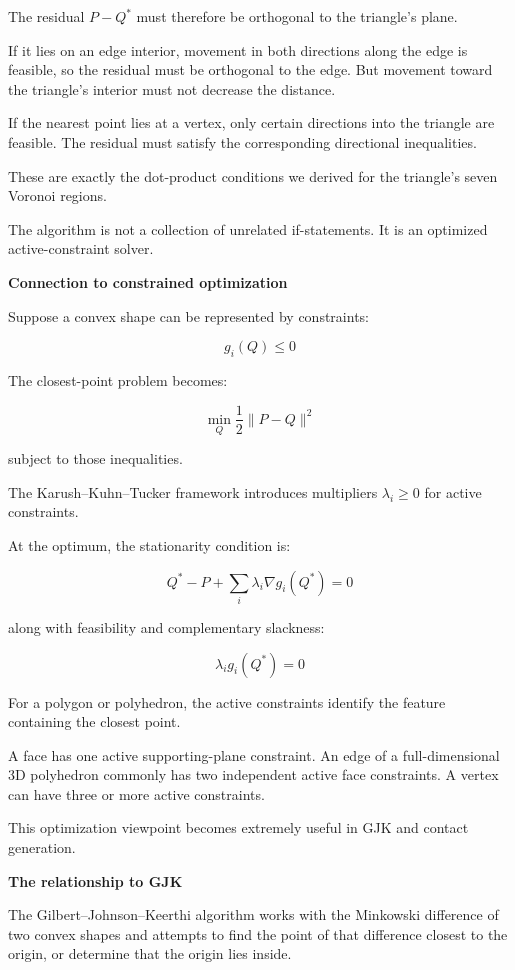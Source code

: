 The residual \(P-Q^*\) must therefore be orthogonal to the triangle's plane.

If it lies on an edge interior, movement in both directions along the edge is feasible, so the residual must be orthogonal to the edge. But movement toward the triangle's interior must not decrease the distance.

If the nearest point lies at a vertex, only certain directions into the triangle are feasible. The residual must satisfy the corresponding directional inequalities.

These are exactly the dot-product conditions we derived for the triangle's seven Voronoi regions.

The algorithm is not a collection of unrelated if-statements. It is an optimized active-constraint solver.

\textbf{Connection to constrained optimization}

Suppose a convex shape can be represented by constraints:

\[
g_i(Q)\le0
\]

The closest-point problem becomes:

\[
\min_Q \frac12\|P-Q\|^2
\]

subject to those inequalities.

The Karush--Kuhn--Tucker framework introduces multipliers \(\lambda_i\ge0\) for active constraints.

At the optimum, the stationarity condition is:

\[
Q^*-P+\sum_i\lambda_i\nabla g_i(Q^*)=0
\]

along with feasibility and complementary slackness:

\[
\lambda_i g_i(Q^*)=0
\]

For a polygon or polyhedron, the active constraints identify the feature containing the closest point.

A face has one active supporting-plane constraint. An edge of a full-dimensional 3D polyhedron commonly has two independent active face constraints. A vertex can have three or more active constraints.

This optimization viewpoint becomes extremely useful in GJK and contact generation.

\textbf{The relationship to GJK}

The Gilbert--Johnson--Keerthi algorithm works with the Minkowski difference of two convex shapes and attempts to find the point of that difference closest to the origin, or determine that the origin lies inside.

